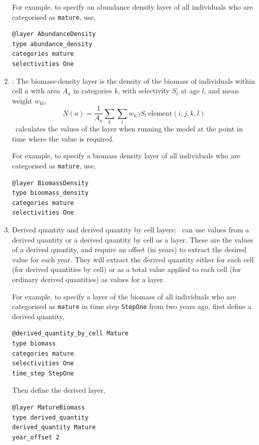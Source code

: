 \begin{enumerate}
For example, to specify an abundance density layer of all individuals who are categorised as \texttt{mature}, use,
{\small{\begin{verbatim}
@layer AbundanceDensity
type abundance_density
categories mature
selectivities One
\end{verbatim}}}

\item {}: The biomass-density layer is the density of the biomass of individuals within cell $a$ with area $A_a$ in categories $k$, with selectivity $S_l$ at age $l$, and mean weight $w_{kl}$,
\begin{equation}
  N(a) = \frac{1}{A_a} \sum\limits_{k} \sum\limits_l w_{k,l} S_l \ \text{element}(i,j,k,l)
\end{equation}
\SPM\ calculates the values of the layer when running the model at the point in time where the value is required.

For example, to specify a biomass density layer of all individuals who are categorised as \texttt{mature}, use,
{\small{\begin{verbatim}
@layer BiomassDensity
type bioomass_density
categories mature
selectivities One
\end{verbatim}}}

\item {Derived quantity and derived quantity by cell layers}\label{derived quantity layer}: \SPM\ can use values from a derived quantity or a derived quantity by cell as a layer. These are the values of a derived quantity, and require an offset (in years) to extract the desired value for each year. They will extract the derived quantity either for each cell (for derived quantities by cell) or as a total value applied to each cell (for ordinary derived quantities) as values for a layer.

For example, to specify a layer of the biomass of all individuals who are categorised as \texttt{mature} in time step \texttt{StepOne} from two years ago, first define a derived quantity,
{\small{\begin{verbatim}
@derived_quantity_by_cell Mature
type biomass
categories mature
selectivities One
time_step StepOne
\end{verbatim}}}

Then define the derived layer,
{\small{\begin{verbatim}
@layer MatureBiomass
type derived_quantity
derived_quantity Mature
year_offset 2
\end{verbatim}}}


\end{enumerate}
